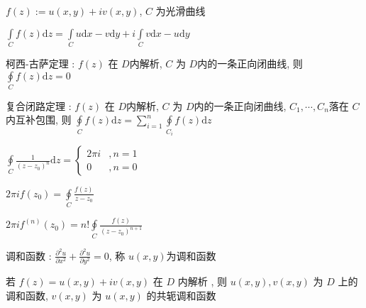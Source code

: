 \documentclass[UTF8, 12pt]{ctexart}
\begin{document}
	$ f(z) := u(x, y) + iv(x, y) $, $ C $ 为光滑曲线

	$ \int\limits_{C}f(z)\mathrm{d}z = \int\limits_{C}u\mathrm{d}x-v\mathrm{d}y + i \int\limits_{C}v\mathrm{d}x-u\mathrm{d}y $

	柯西-古萨定理 : $ f(z) $ 在 $ D $内解析, $ C $ 为 $ D $内的一条正向闭曲线, 则 $ \oint\limits_{C}f(z)\mathrm{d}z = 0 $

	复合闭路定理 : $ f(z) $ 在 $ D $内解析, $ C $ 为 $ D $内的一条正向闭曲线, $ C_{1}, \cdots, C_{n} $落在 $ C $内互补包围, 则 $ \oint\limits_{C}f(z)\mathrm{d}z = \sum_{i=1}^{n}\oint\limits_{C_{i}}f(z)\mathrm{d}z $

	$ \oint\limits_{C}\frac{1}{(z-z_{0})^{n}}\mathrm{d}z = \begin{cases} 2\pi i&, n = 1 \\ 0&, n = 0 \end{cases} $

	$ 2\pi if(z_{0}) = \oint\limits_{C}\frac{f(z)}{z-z_{0}} $

	$ 2\pi if^{(n)}(z_{0}) = n!\oint\limits_{C}\frac{f(z)}{(z-z_{0})^{n+1}} $

	调和函数 : $ \frac{\partial^{2} u}{\partial x^{2}} + \frac{\partial^{2} u}{\partial y^{2}} = 0 $, 称 $ u(x, y) $为调和函数

	若 $ f(z) = u(x, y) + iv(x, y) $ 在 $ D $ 内解析 , 则 $ u(x, y), v(x, y) $ 为 $ D $ 上的调和函数, $ v(x, y) $ 为 $ u(x, y) $ 的共轭调和函数
\end{document}
